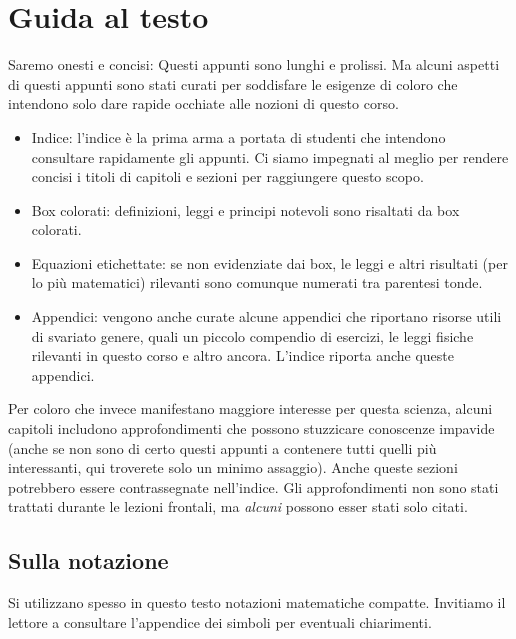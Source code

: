 \chapter*{Guida al testo}
Saremo onesti e concisi: Questi appunti sono lunghi e prolissi.
Ma alcuni aspetti di questi appunti sono
stati curati per soddisfare le esigenze di coloro che intendono solo dare rapide
occhiate alle nozioni di questo corso.

\begin{itemize}
    \item Indice: l'indice è la prima arma a portata di studenti che intendono
    consultare rapidamente gli appunti. Ci siamo impegnati al meglio per rendere
    concisi i titoli di capitoli e sezioni per raggiungere questo scopo.

    \item Box colorati: definizioni, leggi e principi notevoli sono risaltati
    da box colorati.
    
    \item Equazioni etichettate: se non evidenziate dai box, le leggi e altri
    risultati (per lo più matematici) rilevanti sono comunque numerati tra
    parentesi tonde.

    \item Appendici: vengono anche curate alcune appendici che riportano risorse
    utili di svariato genere, quali un piccolo compendio di esercizi, le leggi
    fisiche rilevanti in questo corso e altro ancora. L'indice riporta anche
    queste appendici.
\end{itemize}

Per coloro che invece manifestano maggiore interesse per questa scienza, alcuni
capitoli includono approfondimenti che possono stuzzicare conoscenze impavide (anche
se non sono di certo questi appunti a contenere tutti quelli più interessanti,
qui troverete solo un minimo assaggio). Anche queste sezioni potrebbero essere
contrassegnate nell'indice.
Gli approfondimenti non sono stati trattati durante le lezioni frontali, ma
\textit{alcuni} possono esser stati solo citati.

\section*{Sulla notazione}
Si utilizzano spesso in questo testo notazioni matematiche compatte.
Invitiamo il lettore a consultare l'appendice dei simboli per eventuali
chiarimenti.

